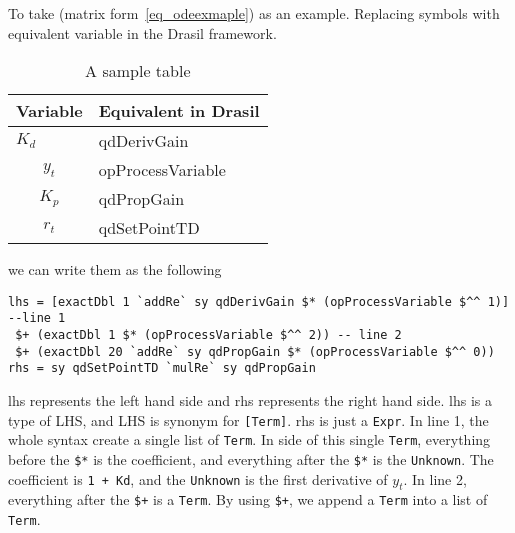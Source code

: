 To take (matrix form~\ref{eq_odeexmaple}) as an example. Replacing symbols with equivalent variable in the Drasil framework.

\begin{table}
	\begin{tabular}{ p{} p{} }
		\textbf{Variable} & \textbf{Equivalent in Drasil} \\
		\toprule
		$K_d$ & qdDerivGain\\
		\[y_t\] & opProcessVariable\\
		\[K_p\] & qdPropGain\\
		\[r_t\] & qdSetPointTD\\
		\bottomrule	
	\end{tabular}	
	\caption{A sample table}	
	\label{tab_inputtype}
\end{table}

we can write them as the following
\begin{lstlisting}[language=HaskellUlisses]
lhs = [exactDbl 1 `addRe` sy qdDerivGain $* (opProcessVariable $^^ 1)] --line 1
 $+ (exactDbl 1 $* (opProcessVariable $^^ 2)) -- line 2
 $+ (exactDbl 20 `addRe` sy qdPropGain $* (opProcessVariable $^^ 0))
rhs = sy qdSetPointTD `mulRe` sy qdPropGain
\end{lstlisting}

lhs represents the left hand side and rhs represents the right hand side. lhs is a type of LHS, and LHS is synonym for \verb|[Term]|. rhs is just a \verb|Expr|. In line 1, the whole syntax create a single list of \verb|Term|. In side of this single \verb|Term|, everything before the \verb|$*| is the coefficient, and everything after the \verb|$*| is the \verb|Unknown|. The coefficient is \verb|1 + Kd|, and the \verb|Unknown| is the first derivative of $y_t$. In line 2, everything after the \verb|$+| is a \verb|Term|. By using \verb|$+|, we append a \verb|Term| into a list of \verb|Term|.

